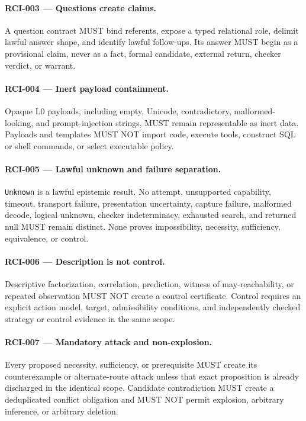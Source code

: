 \documentclass[11pt]{article}
\begin{document}
\paragraph{RCI-003 --- Questions create claims.}
A question contract MUST bind referents, expose a typed relational role, delimit
lawful answer shape, and identify lawful follow-ups. Its answer MUST begin as a
provisional claim, never as a fact, formal candidate, external return, checker
verdict, or warrant.

\paragraph{RCI-004 --- Inert payload containment.}
Opaque L0 payloads, including empty, Unicode, contradictory, malformed-looking,
and prompt-injection strings, MUST remain representable as inert data. Payloads
and templates MUST NOT import code, execute tools, construct SQL or shell
commands, or select executable policy.

\paragraph{RCI-005 --- Lawful unknown and failure separation.}
\texttt{Unknown} is a lawful epistemic result. No attempt, unsupported
capability, timeout, transport failure, presentation uncertainty, capture
failure, malformed decode, logical unknown, checker indeterminacy, exhausted
search, and returned null MUST remain distinct. None proves impossibility,
necessity, sufficiency, equivalence, or control.

\paragraph{RCI-006 --- Description is not control.}
Descriptive factorization, correlation, prediction, witness of
may-reachability, or repeated observation MUST NOT create a control certificate.
Control requires an explicit action model, target, admissibility conditions, and
independently checked strategy or control evidence in the same scope.

\paragraph{RCI-007 --- Mandatory attack and non-explosion.}
Every proposed necessity, sufficiency, or prerequisite MUST create its
counterexample or alternate-route attack unless that exact proposition is
already discharged in the identical scope. Candidate contradiction MUST create
a deduplicated conflict obligation and MUST NOT permit explosion, arbitrary
inference, or arbitrary deletion.
\end{document}
